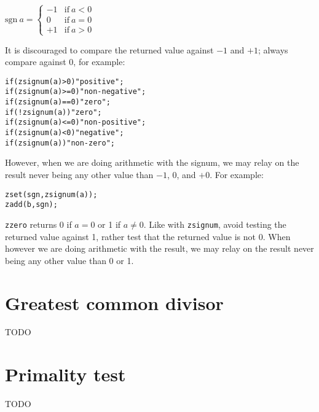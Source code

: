 \vspace{1em}
\( \displaystyle{
    \mbox{sgn}~a = \left \lbrace \begin{array}{rl}
        -1 & \textrm{if}~ a < 0 \\
         0 & \textrm{if}~ a = 0 \\
        +1 & \textrm{if}~ a > 0
    \end{array} \right .
}\)
\vspace{1em}

\noindent
It is discouraged to compare the returned value
against $-1$ and $+1$; always compare against 0,
for example:

\begin{alltt}
   if (zsignum(a) >  0)  "positive";
   if (zsignum(a) >= 0)  "non-negative";
   if (zsignum(a) == 0)  "zero";
   if (!zsignum(a))      "zero";
   if (zsignum(a) <= 0)  "non-positive";
   if (zsignum(a) <  0)  "negative";
   if (zsignum(a))       "non-zero";
\end{alltt}

\noindent
However, when we are doing arithmetic with the
signum, we may relay on the result never being
any other value than $-1$, $0$, and $+0$.
For example:

\begin{alltt}
   zset(sgn, zsignum(a));
   zadd(b, sgn);
\end{alltt}

{\tt zzero} returns 0 if $a = 0$ or 1 if
$a \neq 0$. Like with {\tt zsignum}, avoid
testing the returned value against 1, rather
test that the returned value is not 0. When
however we are doing arithmetic with the
result, we may relay on the result never
being any other value than 0 or 1.


\newpage
\section{Greatest common divisor}
\label{sec:Greatest common divisor}

TODO %


\newpage
\section{Primality test}
\label{sec:Primality test}

TODO %
